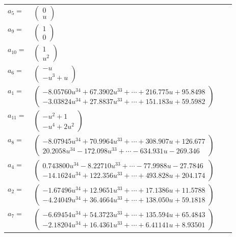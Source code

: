 \documentclass[1p]{elsarticle_modified}
\theoremstyle{definition}
\begin{document}
\begin{tabular}{m{7pt} m{180pt} m{7pt} m{180pt} }
\flushright $a_{5}=$&$\begin{pmatrix}0\\u\end{pmatrix}$ \\
\flushright $a_{9}=$&$\begin{pmatrix}1\\0\end{pmatrix}$ \\
\flushright $a_{10}=$&$\begin{pmatrix}1\\u^2\end{pmatrix}$ \\
\flushright $a_{6}=$&$\begin{pmatrix}- u\\- u^3+u\end{pmatrix}$ \\
\flushright $a_{1}=$&$\begin{pmatrix}-8.05760 u^{34}+67.3902 u^{33}+\cdots+216.775 u+95.8498\\-3.03824 u^{34}+27.8837 u^{33}+\cdots+151.183 u+59.5982\end{pmatrix}$ \\
\flushright $a_{11}=$&$\begin{pmatrix}- u^2+1\\- u^4+2 u^2\end{pmatrix}$ \\
\flushright $a_{8}=$&$\begin{pmatrix}-8.07945 u^{34}+70.9964 u^{33}+\cdots+308.907 u+126.677\\20.2058 u^{34}-172.098 u^{33}+\cdots-634.931 u-269.346\end{pmatrix}$ \\
\flushright $a_{4}=$&$\begin{pmatrix}0.743800 u^{34}-8.22710 u^{33}+\cdots-77.9988 u-27.7846\\-14.1624 u^{34}+122.356 u^{33}+\cdots+493.828 u+204.174\end{pmatrix}$ \\
\flushright $a_{2}=$&$\begin{pmatrix}-1.67496 u^{34}+12.9651 u^{33}+\cdots+17.1386 u+11.5788\\-4.24049 u^{34}+36.4664 u^{33}+\cdots+138.050 u+59.1818\end{pmatrix}$ \\
\flushright $a_{7}=$&$\begin{pmatrix}-6.69454 u^{34}+54.3723 u^{33}+\cdots+135.594 u+65.4843\\-2.18204 u^{34}+16.4361 u^{33}+\cdots+6.41141 u+8.93501\end{pmatrix}$ \\

\end{tabular}
\end{document}
